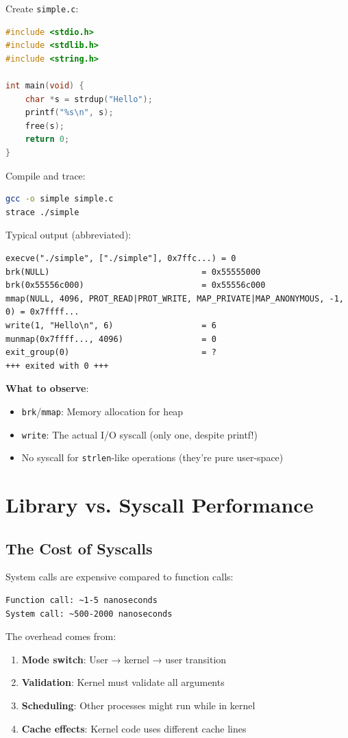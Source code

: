 Create \texttt{simple.c}:
\begin{lstlisting}[language=C]
#include <stdio.h>
#include <stdlib.h>
#include <string.h>

int main(void) {
    char *s = strdup("Hello");
    printf("%s\n", s);
    free(s);
    return 0;
}
\end{lstlisting}

Compile and trace:
\begin{lstlisting}[language=bash]
gcc -o simple simple.c
strace ./simple
\end{lstlisting}

Typical output (abbreviated):
\begin{verbatim}
execve("./simple", ["./simple"], 0x7ffc...) = 0
brk(NULL)                               = 0x55555000
brk(0x55556c000)                        = 0x55556c000
mmap(NULL, 4096, PROT_READ|PROT_WRITE, MAP_PRIVATE|MAP_ANONYMOUS, -1, 0) = 0x7ffff...
write(1, "Hello\n", 6)                  = 6
munmap(0x7ffff..., 4096)                = 0
exit_group(0)                           = ?
+++ exited with 0 +++
\end{verbatim}

\textbf{What to observe}:
\begin{itemize}
    \item \texttt{brk}/\texttt{mmap}: Memory allocation for heap
    \item \texttt{write}: The actual I/O syscall (only one, despite printf!)
    \item No syscall for \texttt{strlen}-like operations (they're pure user-space)
\end{itemize}

\section{Library vs. Syscall Performance}

\subsection{The Cost of Syscalls}

System calls are expensive compared to function calls:

\begin{verbatim}
Function call: ~1-5 nanoseconds
System call: ~500-2000 nanoseconds
\end{verbatim}

The overhead comes from:
\begin{enumerate}
    \item \textbf{Mode switch}: User → kernel → user transition
    \item \textbf{Validation}: Kernel must validate all arguments
    \item \textbf{Scheduling}: Other processes might run while in kernel
    \item \textbf{Cache effects}: Kernel code uses different cache lines
\end{enumerate}

